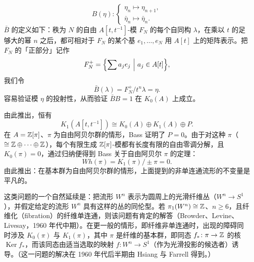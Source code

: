 \[
B(\eta)\colon
\begin{cases}
\eta_{n}\mapsto\eta_{n+1},\\
\bar\eta_{n}\mapsto\bar\eta_{n}.
\end{cases}
\tag{5.13}
\]
$\bar B$ 的定义如下：秩为 $N$ 的自由 $A[t,t^{-1}]$-模 $F_{N}$ 的每个自同构 $\lambda$，在乘以 $t$ 的足够大的幂 $n$ 之后，都可相对于 $F_{N}$ 的某个基 $e_{1},\dots,e_{N}$ 用 $A[t]$ 上的矩阵表示。把 $F_{N}$ 的「正部分」记作
\[
F_{N}^{+}=\Bigl\{\sum a_{j}e_{j}\ \Big|\ a_{j}\in A[t]\Bigr\},
\]
我们令
\begin{equation}
\bar B(\lambda)=F_{N}^{+}/t^{n}\lambda=\eta. \tag{5.14}
\end{equation}
容易验证模 $\eta$ 的投射性，从而验证 $\bar BB=1$ 在 $K_{0}(A)$ 上成立。

由此推出，恒有
\begin{equation}
K_{1}(A[t,t^{-1}])\cong K_{0}(A)\oplus K_{1}(A)\oplus P. \tag{5.15}
\end{equation}
在 $A=\mathbb{Z}[\pi]$、$\pi$ 为自由阿贝尔群的情形，Bass 证明了 $P=0$。由于对这种 $\pi$（$\cong\mathbb{Z}\oplus\dots\oplus\mathbb{Z}$），每个有限生成 $\mathbb{Z}[\pi]$-模都有长度有限的自由零调分解，且 $K_{0}(\pi)=0$，通过归纳便得到 Bass 关于自由阿贝尔 $\pi$ 的定理：
\[
Wh(\pi)=K_{1}(\pi)/\pm\pi=0.
\]
由此推出：在基本群为自由阿贝尔群的情形，上面提到的非单连通流形的不变量是平凡的。%

这类问题的一个自然延续是：把流形 $W^{n}$ 表示为圆周上的光滑纤维丛（$W^{n}\to S^{1}$），并假定给定的流形 $W^{n}$ 具有这样的丛的同伦型。若 $\pi_{1}(W^{n})\cong\mathbb{Z}$、$n\ge 6$，且纤维化（fibration）的纤维单连通，则该问题有肯定的解答（Browder、Levine、Livesay，1960 年代中期）。在更一般的情形，即纤维非单连通时，出现的障碍同时涉及 $K_{0}(\pi)$ 与 $K_{1}(\pi)$，其中 $\pi$ 是纤维的基本群，即同态 $f_{*}\colon\pi\to\mathbb{Z}$ 的核 $\operatorname{Ker}f_{*}$，而该同态由适当选取的映射 $f\colon W^{n}\to S^{1}$（作为光滑投影的候选者）诱导。（这一问题的解决在 1960 年代后半期由 Hsiang 与 Farrell 得到。）

